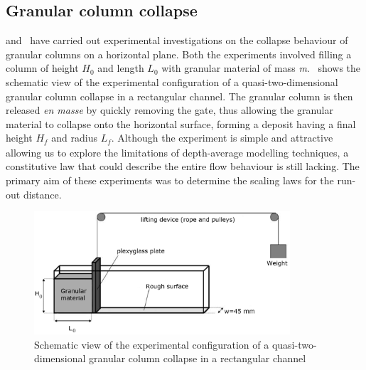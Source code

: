 \subsection{Granular column collapse}

\citet{Lube2005} and~\citet{Lajeunesse2004} have carried out experimental 
investigations on the collapse behaviour of granular columns on a horizontal 
plane. Both the experiments involved filling a column of height 
$\textit{H}_{\textit{0}}$ and length $\textit{L}_{\textit{0}}$ with granular 
material of mass \textit{m}.~ shows the schematic view of the 
experimental configuration of a quasi-two-dimensional granular column collapse 
in a rectangular channel. The granular column is then released \textit{en 
masse} by quickly removing the gate, thus allowing the granular material to 
collapse onto the horizontal surface, forming a deposit having a final height 
$\textit{H}_{\textit{f}}$ and radius $\textit{L}_{\textit{f}}$. Although the 
experiment is simple and attractive allowing us to explore the limitations of 
depth-average modelling techniques, a constitutive law that could describe the 
entire flow behaviour is still lacking. The primary aim of these experiments 
was to determine the scaling laws for the run-out distance.


\begin{figure}[tbhp]
\centering
\includegraphics[width=0.85\textwidth]{experiment_setup}
\caption{Schematic view of the experimental configuration of a 
quasi-two-dimensional granular column 
collapse in a rectangular channel~\citep{Lajeunesse2004}}
\label{fig:exp}
\end{figure}

